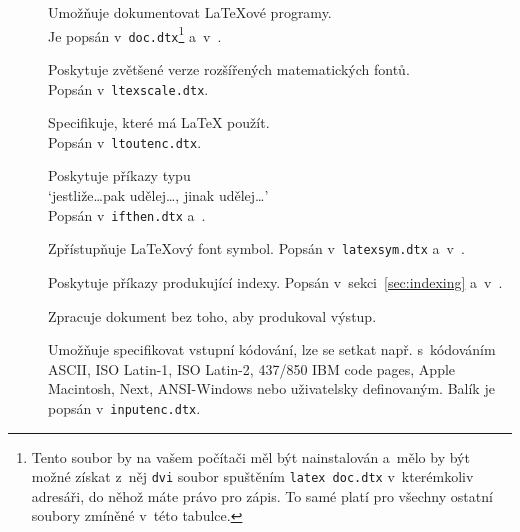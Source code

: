 \begin{table}[btp]
\caption{Některé z~balíků distribuovaných s~\LaTeX em.} \label{packages}
\begin{lined}{\textwidth}
\begin{description}
\item[\normalfont{}] Umožňuje dokumentovat \LaTeX ové programy.\\
 Je popsán v~\texttt{doc.dtx}\footnote{Tento soubor by na vašem počítači
   měl být nainstalován a~mělo by být možné získat z~něj \texttt{dvi} soubor
   spuštěním \texttt{latex doc.dtx} v~kterémkoliv adresáři, do něhož máte
   právo pro zápis. To samé platí pro všechny ostatní soubory zmíněné v~této
   tabulce.} a~v~\companion.

\item[\normalfont{}] Poskytuje zvětšené verze rozšířených
  matematických fontů.\\
  Popsán v~\texttt{ltexscale.dtx}.

\item[\normalfont{}] Specifikuje, které 
  má \LaTeX{} použít.\\
  Popsán v~\texttt{ltoutenc.dtx}.

\item[\normalfont{}] Poskytuje příkazy typu\\ 
  `jestliže\ldots pak udělej\ldots, jinak udělej\ldots'\\ Popsán
  v~\texttt{ifthen.dtx} a~\companion.

\item[\normalfont{}] Zpřístupňuje \LaTeX ový font symbol.
  Popsán v~\texttt{latexsym.dtx} a~v~\companion.
 
\item[\normalfont{}] Poskytuje příkazy produkující indexy.
  Popsán v~sekci~\ref{sec:indexing} a~v~\companion.

\item[\normalfont{}] Zpracuje dokument bez toho, aby produkoval
výstup.
  
\item[\normalfont{}] Umožňuje specifikovat vstupní kódování,
  lze se setkat např. s~kódováním ASCII, ISO \mbox{Latin-1}, ISO Latin-2, 437/850 IBM
  code pages,  Apple Macintosh, Next, ANSI-Windows nebo uživatelsky definovaným.
  Balík je popsán v~\texttt{inputenc.dtx}. 
\end{description}
\end{lined}
\end{table}


